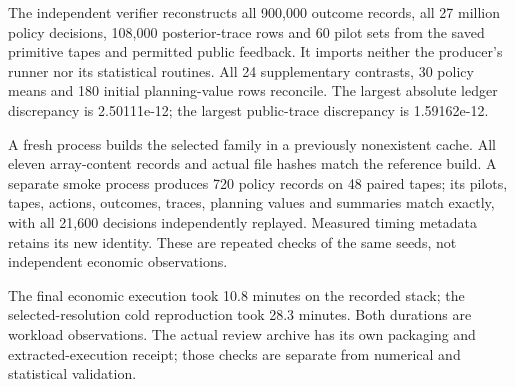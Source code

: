 The independent verifier reconstructs all 900,000 outcome records, all 27 million policy decisions, 108,000 posterior-trace rows and 60 pilot sets from the saved primitive tapes and permitted public feedback. It imports neither the producer's runner nor its statistical routines. All 24 supplementary contrasts, 30 policy means and 180 initial planning-value rows reconcile. The largest absolute ledger discrepancy is 2.50111e-12; the largest public-trace discrepancy is 1.59162e-12.

A fresh process builds the selected family in a previously nonexistent cache. All eleven array-content records and actual file hashes match the reference build. A separate smoke process produces 720 policy records on 48 paired tapes; its pilots, tapes, actions, outcomes, traces, planning values and summaries match exactly, with all 21,600 decisions independently replayed. Measured timing metadata retains its new identity. These are repeated checks of the same seeds, not independent economic observations.

The final economic execution took 10.8 minutes on the recorded stack; the selected-resolution cold reproduction took 28.3 minutes. Both durations are workload observations. The actual review archive has its own packaging and extracted-execution receipt; those checks are separate from numerical and statistical validation.
